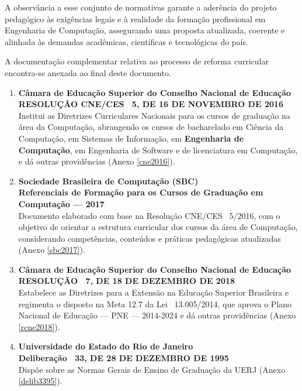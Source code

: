 A observância a esse conjunto de normativas garante a aderência do projeto pedagógico às exigências legais e à realidade da formação profissional em Engenharia de Computação, assegurando uma proposta atualizada, coerente e alinhada às demandas acadêmicas, científicas e tecnológicas do país.

A documentação complementar relativa ao processo de reforma curricular encontra-se anexada ao final deste documento.

\begin{enumerate}
      \item \textbf{Câmara de Educação Superior do Conselho Nacional de Educação}  \\
            \textbf{RESOLUÇÃO CNE/CES ~5, DE 16 DE NOVEMBRO DE 2016} \cite{cne2016} \\
            Institui as Diretrizes Curriculares Nacionais para os cursos de graduação na área da Computação, abrangendo os cursos de bacharelado em Ciência da Computação, em Sistemas de Informação, em \textbf{Engenharia de Computação}, em Engenharia de Software e de licenciatura em Computação, e dá outras providências (Anexo \ref{cne2016}).

      \item \textbf{Sociedade Brasileira de Computação (SBC)}  \\
            \textbf{Referenciais de Formação para os Cursos de Graduação em Computação –-- 2017} \cite{sbc2017}\\
            Documento elaborado com base na Resolução CNE/CES ~5/2016, com o objetivo de orientar a estrutura curricular dos cursos da área de Computação, considerando competências, conteúdos e práticas pedagógicas atualizadas (Anexo \ref{sbc2017}).

      \item \textbf{Câmara de Educação Superior do Conselho Nacional de Educação} \\
            \textbf{RESOLUÇÃO ~7, DE 18 DE DEZEMBRO DE 2018} \cite{cne2018}  \\
            Estabelece as Diretrizes para a Extensão na Educação Superior Brasileira e regimenta o disposto na Meta 12.7 da Lei ~13.005/2014, que aprova o Plano Nacional de Educação –-- PNE –-- 2014-2024 e dá outras providências (Anexo \ref{rcne2018}).

      \item \textbf{Universidade do Estado do Rio de Janeiro}  \\
            \textbf{Deliberação ~33, DE 28 DE DEZEMBRO DE 1995}  \cite{uerj1995}\\
            Dispõe sobre as Normas Gerais de Ensino de Graduação da UERJ (Anexo \ref{delib3395}).


\end{enumerate}
